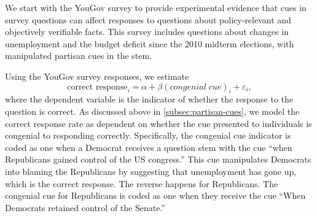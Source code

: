 \documentclass[12pt, letterpaper]{article}
\begin{document}
We start with the YouGov survey to provide experimental evidence that cues in survey questions can affect responses to questions about policy-relevant and objectively verifiable facts. This survey includes questions about changes in unemployment and the budget deficit since the 2010 midterm elections, with manipulated partisan cues in the stem. 

Using the YouGov survey responses, we estimate
\begin{equation}\label{eq:pgap-yougov}
\text{correct response}_{i} = \alpha + \beta (congenial \; cue)_i  +\varepsilon_{i},
\end{equation}
where the dependent variable is the indicator of whether the response to the question is correct.
As discussed above in \cref{subsec:partisan-cues}, we model the correct response rate as dependent on whether the cue presented to individuals is congenial to responding correctly. Specifically, the congenial cue indicator is coded as one when a Democrat receives a question stem with the cue ``when Republicans gained control of the US congress.'' This cue manipulates Democrats into blaming the Republicans by suggesting that unemployment has gone up, which is the correct response. The reverse happens for Republicans. The congenial cue for Republicans is coded as one when they receive the cue ``When Democrats retained control of the Senate.''
\end{document}
